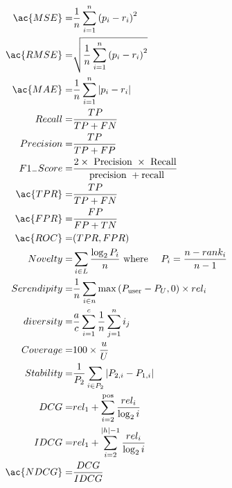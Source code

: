 \cite{fakhfakh_deep_2017}
\begin{align}
\ac{MSE}=         & \frac{1}{n} \sum_{i=1}^{n}\left(p_{i}-r_{i}\right)^{2} \\
\ac{RMSE}=        & \sqrt{\frac{1}{n} \sum_{i=1}^{n}\left(p_{i}-r_{i}\right)^{2}} \\
\ac{MAE}=         & \frac{1}{n} \sum_{i=1}^{n}\left|p_{i}-r_{i}\right| \\
Recall=      & \frac{T P}{T P+F N} \\
Precision=   & \frac{T P}{T P+F P} \\
F1_{-}Score= & \frac{2 \times \text { Precision } \times \text { Recall}}{\text { precision }+\text {recall}} \\
\ac{TPR} =        & \frac{T P}{T P+F N} \\
\ac{FPR} =        & \frac{F P}{F P+T N} \\
\ac{ROC}=& (TPR,FPR)\\
Novelty=     & \sum_{i \in L} \frac{\log _{2} P_{i}}{n} \text { where } \quad P_{i}=\frac{n-r a n k_{i}}{n-1} \\
Serendipity= & \frac{1}{n} \sum_{i \in n} \max \left(P_{\text {user}}-P_{U}, 0\right) \times r e l_{i} \\
diversity=   & \frac{a}{c} \sum_{i=1}^{c} \frac{1}{n} \sum_{j=1}^{n} i_{j} \\
Coverage=    & 100 \times \frac{u}{U} \\
Stability=   & \frac{1}{P_{2}} \sum_{i \in P_{2}}\left|P_{2, i}-P_{1, i}\right| \\
DCG=         & r e l_{1}+\sum_{i=2}^{\text {pos}} \frac{r e l_{i}}{\log _{2} i} \\
IDCG=        & r e l_{1}+\sum_{i=2}^{|h|-1} \frac{r e l_{i}}{\log _{2} i} \\
\ac{NDCG}=        & \frac{D C G}{I D C G} \\
\end{align}

